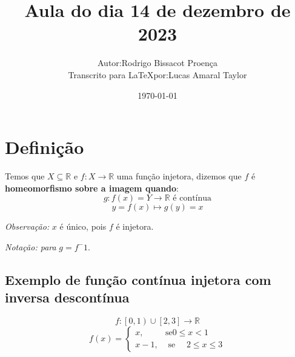 \documentclass[12pt]{article}
\title{Aula do dia 14 de dezembro de 2023}
\author{
    \begin{tabular}{rl}
        Autor: & Rodrigo Bissacot Proença \\
        Transcrito para \LaTeX por: & Lucas Amaral Taylor
    \end{tabular}
}
\date{\today}
\begin{document}
    \maketitle
    \section*{Definição}
    Temos que $X \subseteq \mathbb{R}$ e $f: X \to \mathbb{R}$ uma função injetora, dizemos que $f$ é \textbf{homeomorfismo sobre a imagem quando}:
    \begin{equation*}
        g: f(x) = Y \to \mathbb{R} \text{ é contínua}
    \end{equation*}
    \begin{equation*}
        y = f(x) \mapsto g(y) = x
    \end{equation*}

    \textit{Observação: } $x$ é único, pois $f$ é injetora.

    \textit{Notação: para } $g=f^-1$.

    \subsection*{Exemplo de função contínua injetora com inversa descontínua}
    \begin{equation*}
        f: \left[ 0, 1 \right) \cup \left[2, 3\right] \to \mathbb{R}
    \end{equation*}
    \begin{equation*}
        f(x)= 
        \begin{cases}x, & \text{se}  0\leq x<1 \\ 
        x-1, & \text{ se } \quad 2 \leq x \leq 3
        \end{cases}
    \end{equation*}
\end{document}
